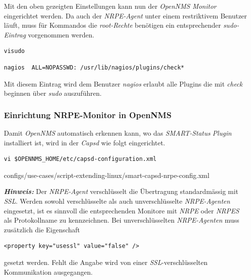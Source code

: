 Mit den oben gezeigten Einstellungen kann nun der \emph{OpenNMS Monitor} eingerichtet werden. Da auch der \emph{NRPE-Agent} unter einem restriktivem Benutzer läuft, muss für Kommandos die \emph{root-Rechte} benötigen ein entsprechender \emph{sudo-Eintrag} vorgenommen werden.

\begin{lstlisting}[numbers=none]
visudo
\end{lstlisting}

\begin{lstlisting}[numbers=none]
nagios  ALL=NOPASSWD: /usr/lib/nagios/plugins/check*
\end{lstlisting}

Mit diesem Eintrag wird dem Benutzer \emph{nagios} erlaubt alle Plugins die mit \emph{check} beginnen über \emph{sudo} auszuführen.

\subsubsection{Einrichtung NRPE-Monitor in OpenNMS}
Damit \emph{OpenNMS} automatisch erkennen kann, wo das \emph{SMART-Status} \emph{Plugin} installiert ist, wird in der \emph{Capsd} wie folgt eingerichtet.

\begin{lstlisting}[numbers=none]
vi $OPENNMS_HOME/etc/capsd-configuration.xml
\end{lstlisting}


  {configs/use-cases/script-extending-linux/smart-capsd-nrpe-config.xml}

\textbf{\textit{Hinweis:}} Der \emph{NRPE-Agent} verschlüsselt die Übertragung standardmässig mit \emph{SSL}. Werden sowohl verschlüsselte als auch unverschlüsselte \emph{NRPE-Agenten} eingesetzt, ist es sinnvoll die entsprechenden Monitore mit \emph{NRPE} oder \emph{NRPES} als Protokollname zu kennzeichnen. Bei unverschlüsselten \emph{NRPE-Agenten} muss zusätzlich die Eigenschaft

\begin{lstlisting}[numbers=none]
<property key="usessl" value="false" />
\end{lstlisting}

gesetzt werden. Fehlt die Angabe wird von einer \emph{SSL}-verschlüsselten Kommunikation ausgegangen.

